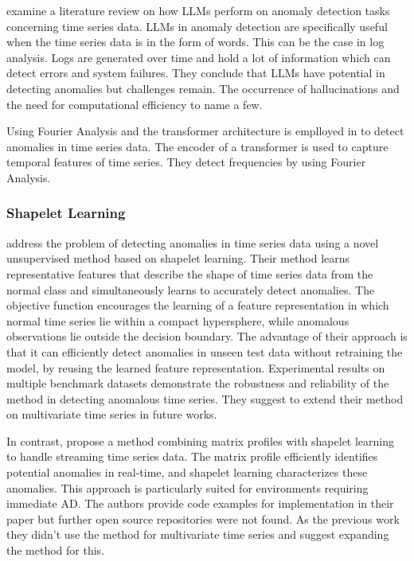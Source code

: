 \cite{su_large_2024} examine a literature review on how LLMs perform on anomaly detection tasks concerning time series data. LLMs in anomaly detection are specifically useful when the time series data is in the form of words. This can be the case in log analysis. Logs are generated over time and hold a lot of information which can detect errors and system failures. They conclude that LLMs have potential in detecting anomalies but challenges remain. The occurrence of hallucinations and the need for computational efficiency to name a few.

Using Fourier Analysis and the transformer architecture is emplloyed in  \cite{ye_multivariate_2023} to detect anomalies in time series data. The encoder of a transformer is used to capture temporal features of time series. They detect frequencies by using Fourier Analysis.

\subsubsection{Shapelet Learning}
\cite{beggel_time_2019} address the problem of detecting anomalies in time series data using a novel unsupervised method based on shapelet learning. Their method learns representative features that describe the shape of time series data from the normal class and simultaneously learns to accurately detect anomalies. The objective function encourages the learning of a feature representation in which normal time series lie within a compact hypersphere, while anomalous observations lie outside the decision boundary.
The advantage of their approach is that it can efficiently detect anomalies in unseen test data without retraining the model, by reusing the learned feature representation. Experimental results on multiple benchmark datasets demonstrate the robustness and reliability of the method in detecting anomalous time series. They suggest to extend their method on multivariate time series in future works.

In contrast, \cite{alshaer_detecting_2020} propose a method combining matrix profiles with shapelet learning to handle streaming time series data. The matrix profile efficiently identifies potential anomalies in real-time, and shapelet learning characterizes these anomalies. This approach is particularly suited for environments requiring immediate AD. The authors provide code examples for implementation in their paper but further open source repositories were not found. As the previous work they didn't use the method for multivariate time series and suggest expanding the method for this.

